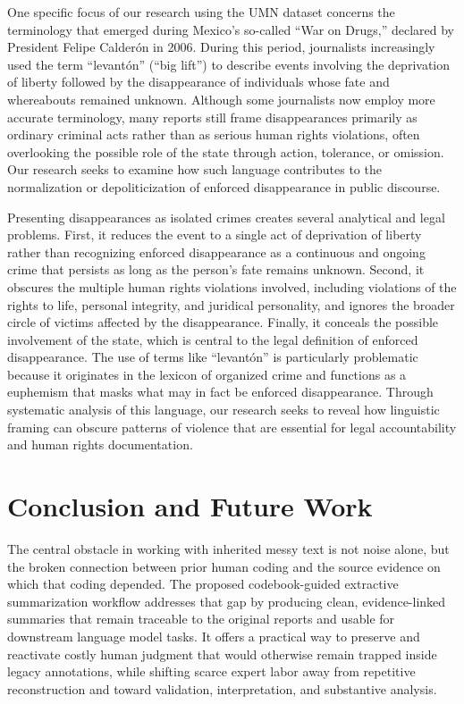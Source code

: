 \documentclass{article}
\begin{document}
One specific focus of our research using the UMN dataset concerns the terminology that emerged during Mexico’s so-called “War on Drugs,” declared by President Felipe Calderón in 2006. During this period, journalists increasingly used the term “levantón” (“big lift”) to describe events involving the deprivation of liberty followed by the disappearance of individuals whose fate and whereabouts remained unknown. Although some journalists now employ more accurate terminology, many reports still frame disappearances primarily as ordinary criminal acts rather than as serious human rights violations, often overlooking the possible role of the state through action, tolerance, or omission. Our research seeks to examine how such language contributes to the normalization or depoliticization of enforced disappearance in public discourse.

Presenting disappearances as isolated crimes creates several analytical and legal problems. First, it reduces the event to a single act of deprivation of liberty rather than recognizing enforced disappearance as a continuous and ongoing crime that persists as long as the person’s fate remains unknown. Second, it obscures the multiple human rights violations involved, including violations of the rights to life, personal integrity, and juridical personality, and ignores the broader circle of victims affected by the disappearance. Finally, it conceals the possible involvement of the state, which is central to the legal definition of enforced disappearance. The use of terms like “levantón” is particularly problematic because it originates in the lexicon of organized crime and functions as a euphemism that masks what may in fact be enforced disappearance. Through systematic analysis of this language, our research seeks to reveal how linguistic framing can obscure patterns of violence that are essential for legal accountability and human rights documentation.


\section{Conclusion and Future Work}\label{conclusion-and-future-work}

The central obstacle in working with inherited messy text is not noise alone, but the broken connection between prior human coding and the source evidence on which that coding depended. The proposed codebook-guided extractive summarization workflow addresses that gap by producing clean, evidence-linked summaries that remain traceable to the original reports and usable for downstream language model tasks. It offers a practical way to preserve and reactivate costly human judgment that would otherwise remain trapped inside legacy annotations, while shifting scarce expert labor away from repetitive reconstruction and toward validation, interpretation, and substantive analysis.
\end{document}
